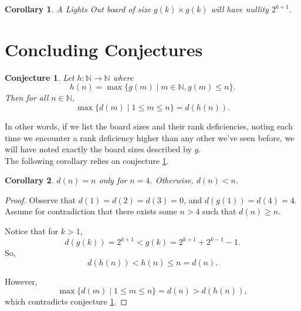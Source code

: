 \documentclass{article}
\newtheorem{corollary}{Corollary}
\newtheorem{conjecture}{Conjecture}
\newcommand{\N}{\mathbb{N}}
\begin{document}
	\begin{corollary}
		A \textit{Lights Out} board of size $g(k) \times g(k)$ will have nullity $2^{k+1}$.
	\end{corollary}
	
	\section{Concluding Conjectures}
	\begin{conjecture}
		\label{conj3}
		Let $h: \N \to \N$ where
		\begin{equation*}
			h(n) = \max \{g(m) \mid m \in \N, g(m) \leq n\}.
		\end{equation*}
		Then for all $n \in \N$,
		\begin{equation*}
			\max \{d(m) \mid 1 \leq m \leq n\} = d(h(n)).
		\end{equation*}
	\end{conjecture}
	In other words, if we list the board sizes and their rank deficiencies, noting each time we encounter a rank deficiency higher than any other we've seen before, we will have noted exactly the board sizes described by $g$. \\
	
	The following corollary relies on conjecture \ref{conj3}.
	\begin{corollary}
		$d(n) = n$ only for $n=4$.
		Otherwise, $d(n) < n$.
	\end{corollary}
	\begin{proof}
		Observe that $d(1) = d(2) = d(3) = 0$, and $d(g(1)) = d(4) = 4$. \\
		
		Assume for contradiction that there exists some $n > 4$ such that $d(n) \geq n$.
		
		Notice that for $k > 1$,
		\begin{equation*}
			d(g(k)) = 2^{k+1} < g(k) = 2^{k+1} + 2^{k-1} - 1.
		\end{equation*}
		So,
		\begin{equation*}
			d(h(n)) < h(n) \leq n = d(n).
		\end{equation*}
	
		However,
		\begin{equation*}
			\max \{d(m) \mid 1 \leq m \leq n\} = d(n) > d(h(n)),
		\end{equation*}
		which contradicts conjecture \ref{conj3}.
	\end{proof}
\end{document}
